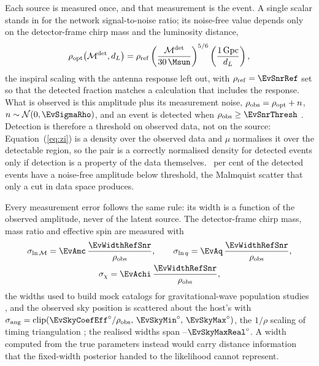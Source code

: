 Each source is measured once, and that measurement is the event. A single
scalar stands in for the network signal-to-noise ratio; its noise-free value depends
only on the detector-frame chirp mass and the luminosity distance,
\begin{equation}
  \rho_{\rm opt}\!\left(\mathcal{M}^{\rm det}, d_L\right) = \rho_{\rm ref}
     \left( \frac{\mathcal{M}^{\rm det}}{30\,\Msun} \right)^{5/6}
     \left( \frac{1\,{\rm Gpc}}{d_L} \right),
  \label{eq:snr}
\end{equation}
the inspiral scaling with the antenna response left out, with
$\rho_{\rm ref} = \EvSnrRef$ set so that the detected fraction matches a
calculation that includes the response. What is observed is this amplitude
plus its measurement noise,
$\rho_{\rm obs} = \rho_{\rm opt} + n$, $n \sim \mathcal{N}(0, \EvSigmaRho)$,
and an event is detected when $\rho_{\rm obs} \geq \EvSnrThresh$
\citep{FishbachHolzFarr2018, Farah2023}. Detection is therefore a threshold on
observed data, not on the source: Equation~(\ref{eq:zi}) is a density over the
observed data and $\mu$ normalises it over the detectable region, so the pair
is a correctly normalised density for detected events only if detection is a
property of the data themselves. \EvMalmquist\ per cent of the detected events
have a noise-free amplitude below threshold, the Malmquist scatter that only a
cut in data space produces.

Every measurement error follows the same rule: its width is a function of the
observed amplitude, never of the latent source. The detector-frame chirp mass,
mass ratio and effective spin are measured with
\begin{equation}
\begin{gathered}
  \sigma_{\ln \mathcal{M}} = \EvAmc\,\frac{\EvWidthRefSnr}{\rho_{\rm obs}},
  \qquad
  \sigma_{\ln q} = \EvAq\,\frac{\EvWidthRefSnr}{\rho_{\rm obs}},\\
  \sigma_{\chi} = \EvAchi\,\frac{\EvWidthRefSnr}{\rho_{\rm obs}},
\end{gathered}
  \label{eq:widths}
\end{equation}
the widths used to build mock catalogs for gravitational-wave population
studies \citep{FishbachHolzFarr2018, Farah2023}, and the observed sky position
is scattered about the host's with
$\sigma_{\rm ang} = \mathrm{clip}\!\left(
\EvSkyCoefEff^\circ/\rho_{\rm obs},\, \EvSkyMin^\circ,\, \EvSkyMax^\circ
\right)$, the $1/\rho$ scaling of timing triangulation \citep{Fairhurst2009};
the realised widths span \EvSkyMinReal--$\EvSkyMaxReal^\circ$. A width
computed from the true parameters instead would carry distance information
that the fixed-width posterior handed to the likelihood cannot represent.

